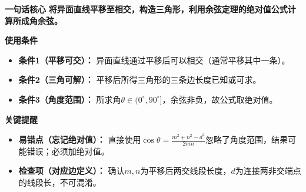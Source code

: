 \begin{summarybox}
	\textbf{\textcolor{CSummary}{一句话核心}}
	\textbf{将异面直线平移至相交，构造三角形，利用余弦定理的绝对值公式计算所成角余弦。}

	\medskip
	\textbf{\textcolor{CSummary}{使用条件}}
	\begin{itemize}[leftmargin=*, itemsep=0.5em, topsep=0.4em]
		\item \textbf{条件1（平移可交）：} 异面直线通过平移后可以相交（通常平移其中一条）。
		\item \textbf{条件2（三角可解）：} 平移后所得三角形的三条边长度已知或可求。
		\item \textbf{条件3（角度范围）：} 所求角$\theta\in(0^\circ,90^\circ]$，余弦非负，故公式取绝对值。
	\end{itemize}

	\medskip
	\textbf{\textcolor{CSummary}{关键提醒}}
	\begin{itemize}[leftmargin=*, itemsep=0.5em, topsep=0.4em]
		\item \textbf{易错点（忘记绝对值）：} 直接使用$\cos\theta=\frac{m^2+n^2-d^2}{2mn}$忽略了角度范围，结果可能错误；必须加绝对值。
		\item \textbf{检查项（对应边定义）：} 确认$m,n$为平移后两交线段长度，$d$为连接两非交端点的线段长，不可混淆。
	\end{itemize}

\end{summarybox}
